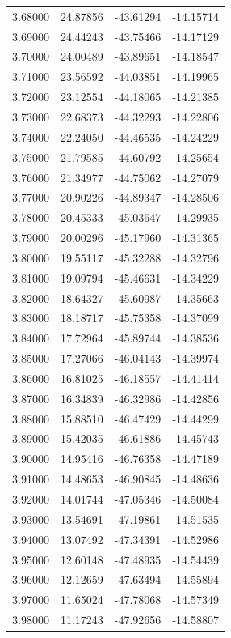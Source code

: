 \begin{table}
\begin{tabular}{llll}
3.68000 & 24.87856 & -43.61294 & -14.15714 \\
3.69000 & 24.44243 & -43.75466 & -14.17129 \\
3.70000 & 24.00489 & -43.89651 & -14.18547 \\
3.71000 & 23.56592 & -44.03851 & -14.19965 \\
3.72000 & 23.12554 & -44.18065 & -14.21385 \\
3.73000 & 22.68373 & -44.32293 & -14.22806 \\
3.74000 & 22.24050 & -44.46535 & -14.24229 \\
3.75000 & 21.79585 & -44.60792 & -14.25654 \\
3.76000 & 21.34977 & -44.75062 & -14.27079 \\
3.77000 & 20.90226 & -44.89347 & -14.28506 \\
3.78000 & 20.45333 & -45.03647 & -14.29935 \\
3.79000 & 20.00296 & -45.17960 & -14.31365 \\
3.80000 & 19.55117 & -45.32288 & -14.32796 \\
3.81000 & 19.09794 & -45.46631 & -14.34229 \\
3.82000 & 18.64327 & -45.60987 & -14.35663 \\
3.83000 & 18.18717 & -45.75358 & -14.37099 \\
3.84000 & 17.72964 & -45.89744 & -14.38536 \\
3.85000 & 17.27066 & -46.04143 & -14.39974 \\
3.86000 & 16.81025 & -46.18557 & -14.41414 \\
3.87000 & 16.34839 & -46.32986 & -14.42856 \\
3.88000 & 15.88510 & -46.47429 & -14.44299 \\
3.89000 & 15.42035 & -46.61886 & -14.45743 \\
3.90000 & 14.95416 & -46.76358 & -14.47189 \\
3.91000 & 14.48653 & -46.90845 & -14.48636 \\
3.92000 & 14.01744 & -47.05346 & -14.50084 \\
3.93000 & 13.54691 & -47.19861 & -14.51535 \\
3.94000 & 13.07492 & -47.34391 & -14.52986 \\
3.95000 & 12.60148 & -47.48935 & -14.54439 \\
3.96000 & 12.12659 & -47.63494 & -14.55894 \\
3.97000 & 11.65024 & -47.78068 & -14.57349 \\
3.98000 & 11.17243 & -47.92656 & -14.58807 \\

\end{tabular}
\end{table}
